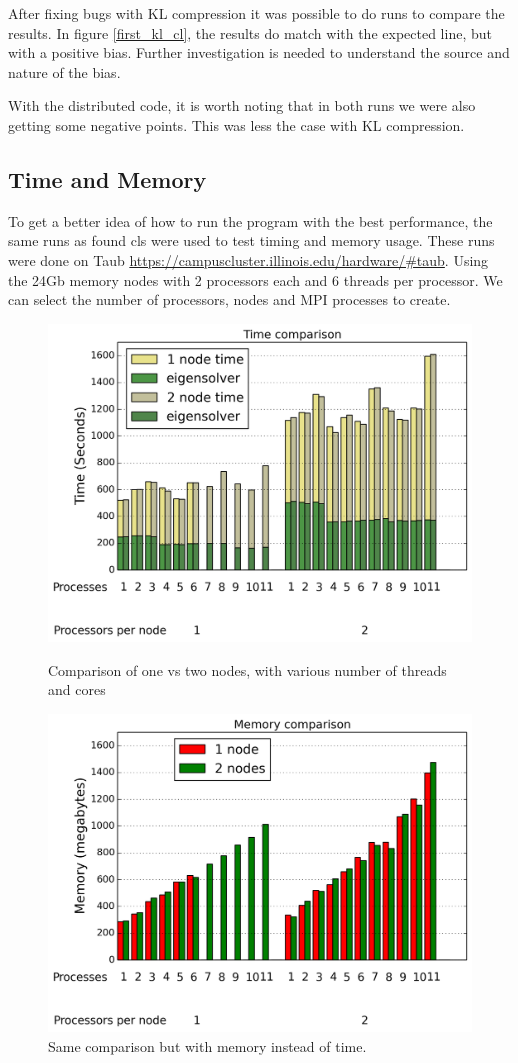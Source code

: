 \documentclass[twocolumn]{article}
\begin{document}
After fixing bugs with KL compression it was possible to do runs to compare the results. In figure \ref{first_kl_cl}, the results do match with the expected line, but with a positive bias. Further investigation is needed to understand the source and nature of the bias.

With the distributed code, it is worth noting that in both runs we were also getting some negative points. This was less the case with KL compression.

\newpage
\subsection{Time and Memory}
To get a better idea of how to run the program with the best performance, the same runs as found cls were used to test timing and memory usage. These runs were done on Taub \url{https://campuscluster.illinois.edu/hardware/#taub}. Using the 24Gb memory nodes with 2 processors each and 6 threads per processor. We can select the number of processors, nodes and MPI processes to create.

\begin{figure}
\includegraphics[width=0.9\columnwidth]{figures/node_comp_time}
\caption{Comparison of one vs two nodes, with various number of threads and cores}
\label{node_compare_time}
\includegraphics[width=0.9\columnwidth]{figures/node_comp_memory}
\caption{Same comparison but with memory instead of time.}
\label{node_compare_memory}
\end{figure}
\end{document}
